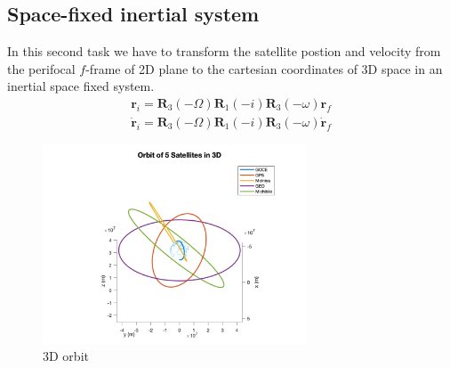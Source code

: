 \documentclass[12pt
,headinclude
,headsepline
,bibtotocnumbered
]{scrartcl}
\begin{document}
\subsection*{Space-fixed inertial system}
In this second task we have to transform the satellite postion and velocity from the perifocal $f$-frame of 2D plane to the cartesian coordinates of 3D space in an inertial space fixed system. 
\begin{align*}
    \boldsymbol{r}_i=\boldsymbol{R}_3(-\Omega)\boldsymbol{R}_1(-i)\boldsymbol{R}_3(-\omega)\boldsymbol{r}_f\\
    \dot{\boldsymbol{r}}_i=\boldsymbol{R}_3(-\Omega)\boldsymbol{R}_1(-i)\boldsymbol{R}_3(-\omega)\dot{\boldsymbol{r}}_f
\end{align*}
\begin{figure}[H]
    \centering
    \includegraphics[width=0.7\textwidth]{plots/orb3d.png}
    \caption{3D orbit}
    \label{fig:3D_orbit}
\end{figure}
\end{document}
